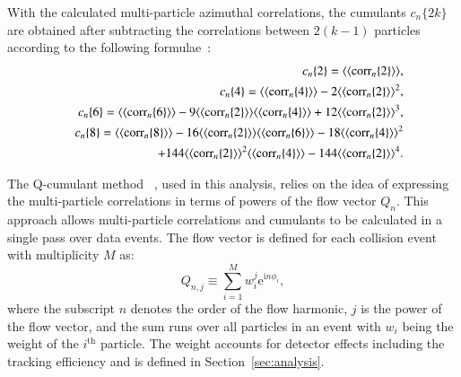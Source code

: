 \documentclass[cernpreprint,texlive=2014,txfonts,UKenglish]{latex/atlasdoc}
\begin{document}
With the calculated multi-particle azimuthal correlations,  the cumulants $c_n\{2k\}$  are obtained after subtracting the correlations between $2(k-1)$ particles according to the following formulae~\cite{Borghini:2000,Snellings}:
\begin{eqnarray}
  &&   c_n\{2\}=\langle\left\langle \mathrm{corr}_n\{2\}\right\rangle\rangle,  \nonumber \\
  &&   c_n\{4\}=\langle\left\langle \mathrm{corr}_n\{4\}\right\rangle\rangle -2\langle\left\langle \mathrm{corr}_n\{2\}\right\rangle\rangle ^2, \nonumber \\
  &&   c_n\{6\}=\langle\left\langle \mathrm{corr}_n\{6\}\right\rangle\rangle -9\langle\left\langle \mathrm{corr}_n\{2\}\right\rangle\rangle \langle\left\langle \mathrm{corr}_n\{4\}\right\rangle\rangle +12 \langle\left\langle \mathrm{corr}_n\{2\}\right\rangle\rangle ^3, \nonumber \\
  &&   c_n\{8\}=\langle\left\langle \mathrm{corr}_n\{8\}\right\rangle\rangle -16\langle\left\langle \mathrm{corr}_n\{2\}\right\rangle\rangle \langle\left\langle \mathrm{corr}_n\{6\}\right\rangle\rangle -18 \langle\left\langle \mathrm{corr}_n\{4\}\right\rangle\rangle ^2 \nonumber\\&& \hspace{1.4cm} +144 \langle\left\langle \mathrm{corr}_n\{2\}\right\rangle\rangle ^2\langle\left\langle \mathrm{corr}_n\{4\}\right\rangle\rangle -144\langle\left\langle \mathrm{corr}_n\{2\}\right\rangle\rangle^4. \nonumber 
\end{eqnarray} 

The Q-cumulant  method ~\cite{Snellings}, used in this analysis, relies on the idea of expressing the multi-particle correlations in terms of powers of the flow vector $Q_{n}$. This approach allows multi-particle correlations and cumulants to be calculated in a single pass over data events. The flow vector is defined for each collision event with multiplicity $M$ as: 
\begin{equation}
Q_{n,j}\equiv \sum_{i=1}^{M} w_{i}^j  \mathrm{e}^{\mathrm{i}n\phi_i},
\label{eq:qnweighted}
\end{equation}
\noindent
where the subscript $n$ denotes the order of the flow harmonic, $j$ is the power of the flow vector, and the sum runs over all particles in an event with $w_{i}$ being the weight of the $i^{\mathrm{th}}$ particle.  The weight accounts for detector effects including the tracking efficiency and is defined in Section~\ref{sec:analysis}. 
\end{document}
